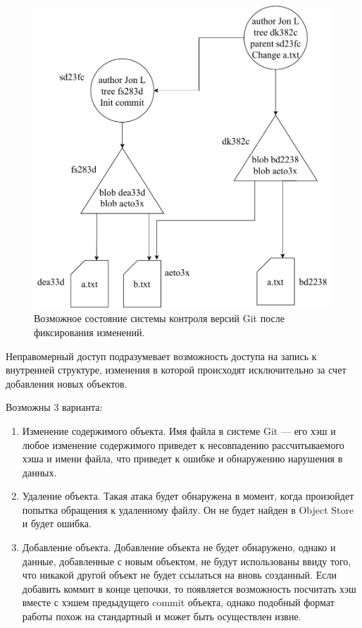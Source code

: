 \begin{figure}[hbtp]
    \centering
    \includegraphics[width=\textwidth]{./img/git-commit.pdf}
    \caption{Возможное состояние системы контроля версий Git после фиксирования изменений.}
    \label{fig:git3}
\end{figure}

Неправомерный доступ подразумевает возможность доступа на запись к внутренней структуре, изменения в которой происходят исключительно за счет добавления новых объектов.

Возможны 3 варианта:
\begin{enumerate}
    \item Изменение содержимого объекта. Имя файла в системе Git --- его хэш и любое изменение содержимого приведет к несовпадению рассчитываемого хэша и имени файла, что приведет к ошибке и обнаружению нарушения в данных.
    \item Удаление объекта. Такая атака будет обнаружена в момент, когда произойдет попытка обращения к удаленному файлу. Он не будет найден в Object Store и будет ошибка.
    \item Добавление объекта. Добавление объекта не будет обнаружено, однако и данные, добавленные с новым объектом, не будут использованы ввиду того, что никакой другой объект не будет ссылаться на вновь созданный. Если добавить коммит в конце цепочки, то появляется возможность посчитать хэш вместе с хэшем предыдущего commit объекта, однако подобный формат работы похож на стандартный и может быть осуществлен извне.
\end{enumerate}

